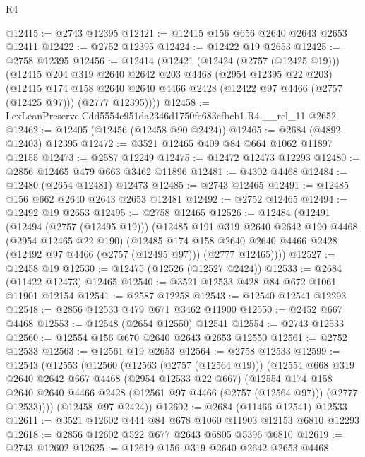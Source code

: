 \begin{lexlean}{R4}
\begin{coremodule}
@12415 := @2743 @12395
@12421 := @12415 @156 @656 @2640 @2643 @2653 @12411
@12422 := @2752 @12395
@12424 := @12422 @19 @2653
@12425 := @2758 @12395
@12456 := @12414
    (@12421
      (@12424 (@2757 (@12425 @19)))
      (@12415
        @204
        @319
        @2640
        @2642
        @203
        @4468
        (@2954 @12395 @22 @203)
        (@12415
          @174
          @158
          @2640
          @2640
          @4466
          @2428
          (@12422 @97 @4466 (@2757 (@12425 @97)))
          (@2777 @12395))))
@12458 := LexLeanPreserve.Cdd5554c951da2346d1750fe683cfbcb1.R4.__rel_11 @2652
@12462 := @12405 (@12456 (@12458 @90 @2424))
@12465 := @2684 (@4892 @12403) @12395
@12472 := @3521 @12465 @409 @84 @664 @1062 @11897 @12155
@12473 := @2587 @12249
@12475 := @12472 @12473 @12293
@12480 := @2856 @12465 @479 @663 @3462 @11896
@12481 := @4302 @4468
@12484 := @12480 (@2654 @12481) @12473
@12485 := @2743 @12465
@12491 := @12485 @156 @662 @2640 @2643 @2653 @12481
@12492 := @2752 @12465
@12494 := @12492 @19 @2653
@12495 := @2758 @12465
@12526 := @12484
    (@12491
      (@12494 (@2757 (@12495 @19)))
      (@12485
        @191
        @319
        @2640
        @2642
        @190
        @4468
        (@2954 @12465 @22 @190)
        (@12485
          @174
          @158
          @2640
          @2640
          @4466
          @2428
          (@12492 @97 @4466 (@2757 (@12495 @97)))
          (@2777 @12465))))
@12527 := @12458 @19
@12530 := @12475 (@12526 (@12527 @2424))
@12533 := @2684 (@11422 @12473) @12465
@12540 := @3521 @12533 @428 @84 @672 @1061 @11901 @12154
@12541 := @2587 @12258
@12543 := @12540 @12541 @12293
@12548 := @2856 @12533 @479 @671 @3462 @11900
@12550 := @2452 @667 @4468
@12553 := @12548 (@2654 @12550) @12541
@12554 := @2743 @12533
@12560 := @12554 @156 @670 @2640 @2643 @2653 @12550
@12561 := @2752 @12533
@12563 := @12561 @19 @2653
@12564 := @2758 @12533
@12599 := @12543
    (@12553
      (@12560
        (@12563 (@2757 (@12564 @19)))
        (@12554
          @668
          @319
          @2640
          @2642
          @667
          @4468
          (@2954 @12533 @22 @667)
          (@12554
            @174
            @158
            @2640
            @2640
            @4466
            @2428
            (@12561 @97 @4466 (@2757 (@12564 @97)))
            (@2777 @12533))))
      (@12458 @97 @2424))
@12602 := @2684 (@11466 @12541) @12533
@12611 := @3521 @12602 @444 @84 @678 @1060 @11903 @12153 @6810 @12293
@12618 := @2856 @12602 @522 @677 @2643 @6805 @5396 @6810
@12619 := @2743 @12602
@12625 := @12619 @156 @319 @2640 @2642 @2653 @4468

\end{coremodule}
\end{lexlean}
